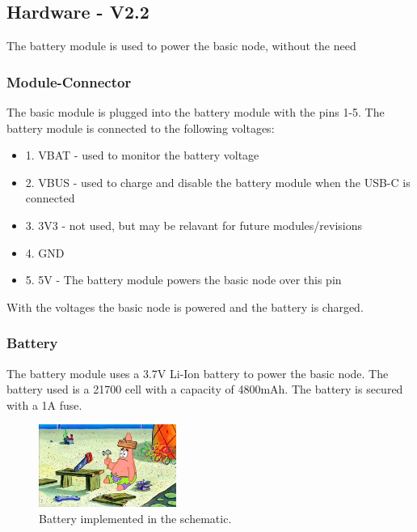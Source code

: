 \subsection{Hardware - V2.2}

    The battery module is used to power the basic node, without the need

    \subsubsection{Module-Connector}
        The basic module is plugged into the battery module with the pins 1-5. 
        The battery module is connected to the following voltages:

        \begin{itemize}
            \item 1. VBAT - used to monitor the battery voltage
            \item 2. VBUS - used to charge and disable the battery module when the USB-C 
            is connected
            \item 3. 3V3 - not used, but may be relavant for future modules/revisions
            \item 4. GND
            \item 5. 5V - The battery module powers the basic node over this pin
        \end{itemize}
        
        With the voltages the basic node is powered and the battery is charged.


    \subsubsection{Battery}

        The battery module uses a 3.7V Li-Ion battery to power the basic node. The battery 
        used is a 21700 cell with a capacity of 4800mAh. The battery is secured with a 1A fuse.
 
        \begin{figure}[H]
            \centering
            \includegraphics[width=0.4\textwidth]{assets/HW/TBD.png}
            \caption{Battery implemented in the schematic.}
        \end{figure}

